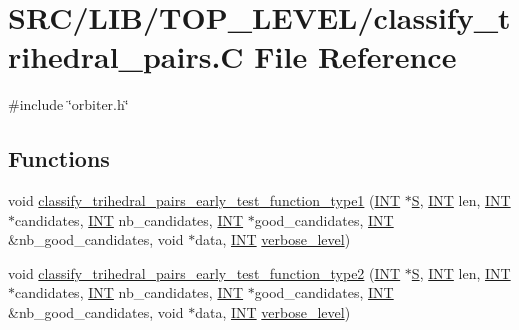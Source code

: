 \hypertarget{classify__trihedral__pairs_8_c}{}\section{S\+R\+C/\+L\+I\+B/\+T\+O\+P\+\_\+\+L\+E\+V\+E\+L/classify\+\_\+trihedral\+\_\+pairs.C File Reference}
\label{classify__trihedral__pairs_8_c}
{\ttfamily \#include \char`\"{}orbiter.\+h\char`\"{}}\newline
\subsection*{Functions}
\begin{DoxyCompactItemize}
\item 
void \mbox{\hyperlink{classify__trihedral__pairs_8_c_a8e073cc2119af8d50d4c42db4c514e48}{classify\+\_\+trihedral\+\_\+pairs\+\_\+early\+\_\+test\+\_\+function\+\_\+type1}} (\mbox{\hyperlink{galois_8h_a09fddde158a3a20bd2dcadb609de11dc}{I\+NT}} $\ast$\mbox{\hyperlink{simeon_8_c_adab47f8243f1b5a2c31df2535d6b37d0}{S}}, \mbox{\hyperlink{galois_8h_a09fddde158a3a20bd2dcadb609de11dc}{I\+NT}} len, \mbox{\hyperlink{galois_8h_a09fddde158a3a20bd2dcadb609de11dc}{I\+NT}} $\ast$candidates, \mbox{\hyperlink{galois_8h_a09fddde158a3a20bd2dcadb609de11dc}{I\+NT}} nb\+\_\+candidates, \mbox{\hyperlink{galois_8h_a09fddde158a3a20bd2dcadb609de11dc}{I\+NT}} $\ast$good\+\_\+candidates, \mbox{\hyperlink{galois_8h_a09fddde158a3a20bd2dcadb609de11dc}{I\+NT}} \&nb\+\_\+good\+\_\+candidates, void $\ast$data, \mbox{\hyperlink{galois_8h_a09fddde158a3a20bd2dcadb609de11dc}{I\+NT}} \mbox{\hyperlink{simeon_8_c_a818073fbcc2f439e7c56952f67386122}{verbose\+\_\+level}})
\item 
void \mbox{\hyperlink{classify__trihedral__pairs_8_c_a5488ce713a111e071bea36d799ecfb52}{classify\+\_\+trihedral\+\_\+pairs\+\_\+early\+\_\+test\+\_\+function\+\_\+type2}} (\mbox{\hyperlink{galois_8h_a09fddde158a3a20bd2dcadb609de11dc}{I\+NT}} $\ast$\mbox{\hyperlink{simeon_8_c_adab47f8243f1b5a2c31df2535d6b37d0}{S}}, \mbox{\hyperlink{galois_8h_a09fddde158a3a20bd2dcadb609de11dc}{I\+NT}} len, \mbox{\hyperlink{galois_8h_a09fddde158a3a20bd2dcadb609de11dc}{I\+NT}} $\ast$candidates, \mbox{\hyperlink{galois_8h_a09fddde158a3a20bd2dcadb609de11dc}{I\+NT}} nb\+\_\+candidates, \mbox{\hyperlink{galois_8h_a09fddde158a3a20bd2dcadb609de11dc}{I\+NT}} $\ast$good\+\_\+candidates, \mbox{\hyperlink{galois_8h_a09fddde158a3a20bd2dcadb609de11dc}{I\+NT}} \&nb\+\_\+good\+\_\+candidates, void $\ast$data, \mbox{\hyperlink{galois_8h_a09fddde158a3a20bd2dcadb609de11dc}{I\+NT}} \mbox{\hyperlink{simeon_8_c_a818073fbcc2f439e7c56952f67386122}{verbose\+\_\+level}})
\end{DoxyCompactItemize}


